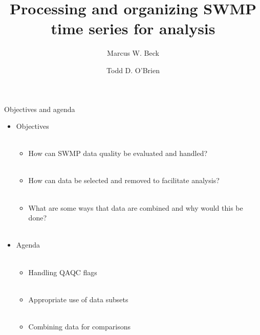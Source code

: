 \documentclass[xcolor=svgnames]{beamer}\usepackage[]{graphicx}\usepackage[]{color}
\begin{document}
\title[SWMP organizing]{Processing and organizing SWMP time series for analysis}

\author[M. Beck, T. O'Brien]{Marcus W. Beck \and Todd D. O'Brien}

\date{}







\begin{frame}{Objectives and agenda}
\begin{itemize}
\onslide<+->
\item Objectives \\~\\
\begin{itemize}
\item How can SWMP data quality be evaluated and handled? \\~\\
\item How can data be selected and removed to facilitate analysis? \\~\\
\item What are some ways that data are combined and why would this be done? \\~\\
\end{itemize}
\onslide<+->
\item Agenda \\~\\
\begin{itemize}
\item Handling QAQC flags\\~\\
\item Appropriate use of data subsets \\~\\
\item Combining data for comparisons \\~\\
\end{itemize}
\end{itemize}
\end{frame}
\end{document}
